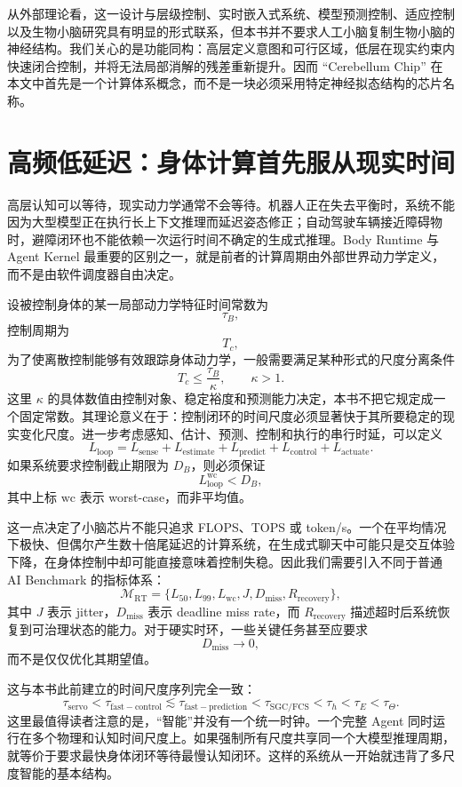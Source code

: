 从外部理论看，这一设计与层级控制、实时嵌入式系统、模型预测控制、适应控制以及生物小脑研究具有明显的形式联系，但本书并不要求人工小脑复制生物小脑的神经结构。我们关心的是功能同构：高层定义意图和可行区域，低层在现实约束内快速闭合控制，并将无法局部消解的残差重新提升。因而 ``Cerebellum Chip'' 在本文中首先是一个计算体系概念，而不是一块必须采用特定神经拟态结构的芯片名称。

\section{高频低延迟：身体计算首先服从现实时间}

高层认知可以等待，现实动力学通常不会等待。机器人正在失去平衡时，系统不能因为大型模型正在执行长上下文推理而延迟姿态修正；自动驾驶车辆接近障碍物时，避障闭环也不能依赖一次运行时间不确定的生成式推理。Body Runtime 与 Agent Kernel 最重要的区别之一，就是前者的计算周期由外部世界动力学定义，而不是由软件调度器自由决定。

设被控制身体的某一局部动力学特征时间常数为
\[
\tau_{B},
\]
控制周期为
\[
T_c,
\]
为了使离散控制能够有效跟踪身体动力学，一般需要满足某种形式的尺度分离条件
\[
T_c
\leq
\frac{\tau_B}{\kappa},
\qquad
\kappa>1.
\]
这里 $\kappa$ 的具体数值由控制对象、稳定裕度和预测能力决定，本书不把它规定成一个固定常数。其理论意义在于：控制闭环的时间尺度必须显著快于其所要稳定的现实变化尺度。进一步考虑感知、估计、预测、控制和执行的串行时延，可以定义
\[
L_{\mathrm{loop}}
=
L_{\mathrm{sense}}
+
L_{\mathrm{estimate}}
+
L_{\mathrm{predict}}
+
L_{\mathrm{control}}
+
L_{\mathrm{actuate}}.
\]
如果系统要求控制截止期限为 $D_B$，则必须保证
\[
L_{\mathrm{loop}}^{\mathrm{wc}}
<
D_B,
\]
其中上标 $\mathrm{wc}$ 表示 worst-case，而非平均值。

这一点决定了小脑芯片不能只追求 FLOPS、TOPS 或 token/s。一个在平均情况下极快、但偶尔产生数十倍尾延迟的计算系统，在生成式聊天中可能只是交互体验下降，在身体控制中却可能直接意味着控制失稳。因此我们需要引入不同于普通 AI Benchmark 的指标体系：
\[
\mathcal M_{\mathrm{RT}}
=
\{
L_{50},
L_{99},
L_{\mathrm{wc}},
J,
D_{\mathrm{miss}},
R_{\mathrm{recovery}}
\},
\]
其中 $J$ 表示 jitter，$D_{\mathrm{miss}}$ 表示 deadline miss rate，而 $R_{\mathrm{recovery}}$ 描述超时后系统恢复到可治理状态的能力。对于硬实时环，一些关键任务甚至应要求
\[
D_{\mathrm{miss}}\rightarrow 0,
\]
而不是仅仅优化其期望值。

这与本书此前建立的时间尺度序列完全一致：
\[
\tau_{\mathrm{servo}}
<
\tau_{\mathrm{fast-control}}
\lesssim
\tau_{\mathrm{fast-prediction}}
<
\tau_{\mathrm{SGC/FCS}}
<
\tau_h
<
\tau_E
<
\tau_\Theta.
\]
这里最值得读者注意的是，``智能''并没有一个统一时钟。一个完整 Agent 同时运行在多个物理和认知时间尺度上。如果强制所有尺度共享同一个大模型推理周期，就等价于要求最快身体闭环等待最慢认知闭环。这样的系统从一开始就违背了多尺度智能的基本结构。

